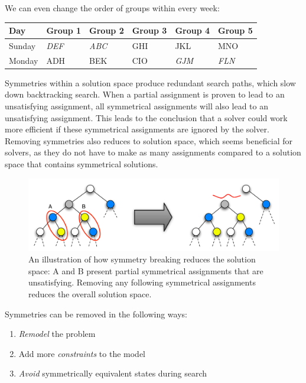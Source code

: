 \documentclass[a4paper]{scrartcl}
\begin{document}
We can even change the order of groups within every week:

\begin{table}[h]
\centering
\begin{tabular}{ l | l  l  l l  l }
Day & Group 1 & Group 2 & Group 3 & Group 4 & Group 5 \\
\hline
Sunday & \emph{DEF} & \emph{ABC} & GHI & JKL & MNO \\
Monday & ADH  & BEK & CIO & \emph{GJM} & \emph{FLN}\\
\end{tabular}
\end{table}

Symmetries within a solution space produce redundant search paths, which slow down backtracking search. When a partial assignment is proven to lead to an unsatisfying assignment, all symmetrical assignments will also lead to an unsatisfying assignment. This leads to the conclusion that a solver could work more efficient if these symmetrical assignments are ignored by the solver. Removing symmetries also reduces to solution space, which seems beneficial for solvers, as they do not have to make as many assignments compared to a solution space that contains symmetrical solutions.

\begin{figure}[h!]
\centering
    \includegraphics[width=13.6cm]{images/symmetry_breaking}
    \caption{An illustration of how symmetry breaking reduces the solution space: A and B present partial symmetrical assignments that are unsatisfying. Removing any following symmetrical assignments reduces the overall solution space.}
\end{figure}

Symmetries can be removed in the following ways:

\begin{enumerate}
\item \emph{Remodel} the problem
\item Add more \emph{constraints} to the model
\item \emph{Avoid} symmetrically equivalent states during search
\end{enumerate}
\end{document}
